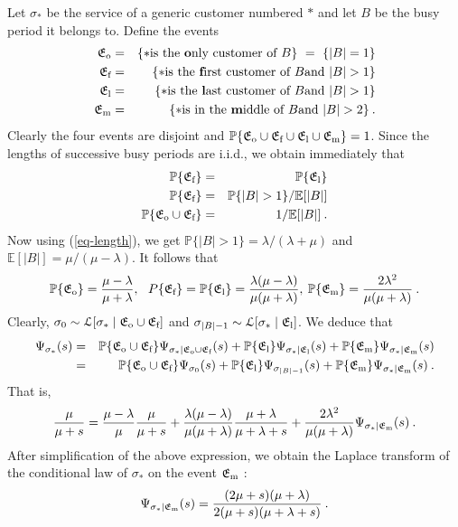 \documentclass[11pt,a4paper]{article}
\numberwithin{equation}{section}
\newcommand{\mrm}[1]{\text{\rm #1}}
\newcommand{\fE}{\mathfrak{E}}
\newcommand{\1}{\mathbbm{1}}
\newcommand{\E}{\mathbb{E}}
\newcommand{\p}{\mathbb{P}}
\newcommand{\Lom}{\mathcal{L}}
\begin{document}
Let $\sigma_*$ be the service of a generic customer numbered $*$
and let $B$ be the busy period it belongs to. Define the events
\begin{eqnarray*}
\fE_{\mrm{o}} &=& \{* \mrm{ is the {\bf o}nly customer of } B\} \ = \ \{ |B|=1\} \\
\fE_{\mrm{f}} &=& \{* \mrm{ is the {\bf f}irst customer of } B \mrm{ and } |B|>1\} \\
\fE_{\mrm{l}} &=& \{* \mrm{ is the {\bf l}ast customer of } B \mrm{ and } |B|>1\} \\
\fE_{\mrm{m}} &=& \{* \mrm{ is in the {\bf m}iddle of } B \mrm{ and } |B|>2\}\:.
\end{eqnarray*}
Clearly the four events are disjoint and $\p\{\fE_{\mrm{o}} \cup \fE_{\mrm{f}} \cup
\fE_{\mrm{l}} \cup \fE_{\mrm{m}}\}=1$. Since the lengths of successive busy periods
are i.i.d., we obtain immediately that
\begin{eqnarray*}
\p\{\fE_{\mrm{f}} \} &=&  \p\{\fE_{\mrm{l}} \} \\
\p\{\fE_{\mrm{f}} \} &=& \p\{|B|>1\} /\E[|B|] \\
\p\{\fE_{\mrm{o}} \cup \fE_{\mrm{f}}\} &=& 1/\E[|B|] \:.
\end{eqnarray*}
Now using (\ref{eq-length}), we get $\p\{|B|>1\}=\lambda/(\lambda+\mu)$
and $\E[|B|]=\mu/(\mu-\lambda)$. It follows that
\begin{equation}\label{eq-proba}
\p\{\fE_{\mrm{o}}\}= \frac{\mu-\lambda}{\mu+\lambda}, \ \ P\{\fE_{\mrm{f}}\}=
\p\{\fE_{\mrm{l}}\}=\frac{\lambda(\mu-\lambda)}{\mu(\mu+\lambda)},\: \p\{\fE_{\mrm{m}}\}=
\frac{2\lambda^2}{\mu(\mu+\lambda)}\:.
\end{equation}
Clearly, $\sigma_0 \sim \Lom[\sigma_*\mid \fE_{\mrm{o}} \cup
\fE_{\mrm{f}}]$ and $\sigma_{|B|-1} \sim \Lom[\sigma_*\mid
\fE_{\mrm{l}}]$. We deduce that
\begin{eqnarray*}
\Psi_{\sigma_*}(s) & = & \p\{\fE_{\mrm{o}} \cup \fE_{\mrm{f}}\}
\Psi_{\sigma_*\mid \fE_{\mrm{o}} \cup
\fE_{\mrm{f}}}(s) +\p\{\fE_{\mrm{l}}\} \Psi_{\sigma_* \mid
\fE_{\mrm{l}}}(s) + \p\{\fE_{\mrm{m}}\} \Psi_{\sigma_*\mid \fE_{\mrm{m}}}(s) \\
& = & \p\{\fE_{\mrm{o}} \cup \fE_{\mrm{f}}\} \Psi_{\sigma_0}(s) +
\p\{\fE_{\mrm{l}}\} \Psi_{\sigma_{|B|-1}}(s) + \p\{\fE_{\mrm{m}}\} \Psi_{\sigma_*\mid \fE_{\mrm{m}}}(s) \:.
\end{eqnarray*}
That is,
\begin{equation*}
\frac{\mu}{\mu + s} =  \frac{\mu-\lambda}{\mu} \frac{\mu}{\mu+s} +
\frac{\lambda(\mu-\lambda)}{\mu(\mu+\lambda)}
\frac{\mu+\lambda}{\mu+\lambda+s} +
\frac{2\lambda^2}{\mu(\mu+\lambda)} \Psi_{\sigma_*\mid \fE_{\mrm{m}}}(s) \:.
\end{equation*}
After simplification of the above expression, we obtain the
Laplace transform of the conditional law of $\sigma_*$ on the event
$\fE_{\mrm{m}}$ :
\begin{equation}\label{eq-midservice}
\Psi_{\sigma_*\mid \fE_{\mrm{m}}}(s)= \frac{(2\mu + s)(\mu + \lambda)}{2(\mu +s)(\mu + \lambda
+s)}\:.
\end{equation}
\end{document}
